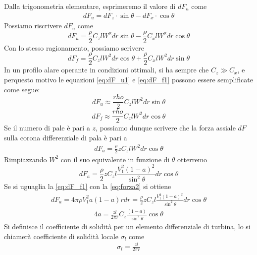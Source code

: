 Dalla trigonometria elementare, esprimeremo il valore di $dF_u$ come
\begin{align*}
dF_u = dF_z \cdot \sin \theta - dF_x \cdot \cos \theta
\end{align*}
Possiamo riscrivere $dF_u$ come
\begin{equation}\label{eq:dF_u1}
dF_u = \frac{\rho}{2} C_z l W^2 dr \sin \theta - \frac{\rho}{2} C_x l W^2 dr \cos \theta
\end{equation}
Con lo stesso ragionamento, possiamo scrivere
\begin{equation}\label{eq:dF_f1}
dF_f = \frac{\rho}{2} C_z l W^2 dr \cos \theta + \frac{\rho}{2} C_x l W^2 dr \sin \theta
\end{equation}
In un profilo alare operante in condizioni ottimali, si ha sempre che $C_z \gg C_x$, e perquesto motivo le equazioni \ref{eq:dF_u1} e \ref{eq:dF_f1} possono essere semplificate come segue:
\begin{equation}\label{eq:dF_u2}
dF_u \approx \frac{rho}{2} C_zl W^2 dr \sin \theta
\end{equation}
\begin{equation}\label{eq:dF_f2}
dF_f \approx \frac{rho}{2} C_zl W^2 dr \cos \theta
\end{equation}
Se il numero di pale è pari a $z$, possiamo dunque scrivere che la forza assiale $dF$ sulla corona differenziale di pala è pari a
\begin{align*}
dF_a = \frac{\rho}{2} z C_z l W^2 dr \cos \theta
\end{align*}
Rimpiazzando $W^2$ con il suo equivalente in funzione di $\theta$ otterremo
\begin{equation}
dF_a = \frac{\rho}{2} z C_z l \frac{V_1^2 \left( 1- a \right)^2}{\sin^2 \theta} dr \cos \theta
\end{equation}
Se si uguaglia la \ref{eq:dF_f1} con la \ref{eq:forza2} si ottiene
\begin{align*}
dF_a = 4 \pi \rho V_1^2 a \left( 1-a \right) r dr = \frac{\rho}{2} z C_z l \frac{V_1^2 \left( 1- a \right)^2 }{\sin^2 \theta} dr \cos \theta
\end{align*}
\begin{align*}
4 a = \frac{z l }{2 \pi r} C_z \frac{\left( 1- a \right)}{\sin^2 \theta} \cos \theta
\end{align*}
Si definisce il coefficiente di solidità per un elemento differenziale di turbina, lo si chiamerà coefficiente di solidità locale $\sigma_l$ come
\begin{align*}
\sigma_l = \frac{z l}{2 \pi r}
\end{align*}
